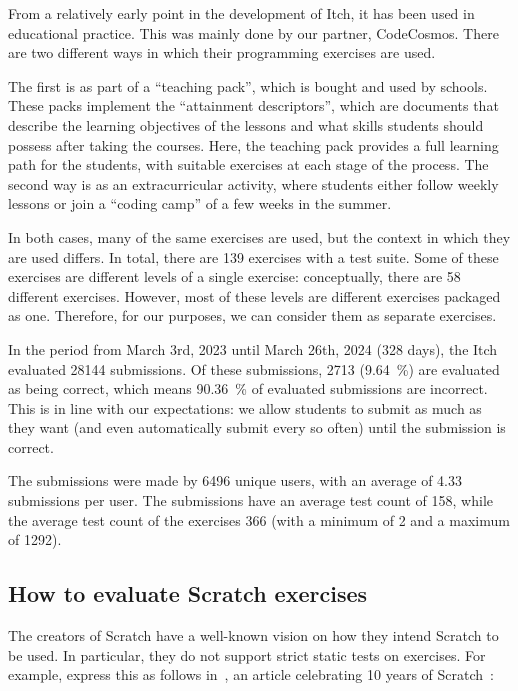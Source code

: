 \documentclass[../main]{subfiles}
\begin{document}
From a relatively early point in the development of Itch, it has been used in educational practice.
This was mainly done by our partner, CodeCosmos.
There are two different ways in which their programming exercises are used.

The first is as part of a ``teaching pack'', which is bought and used by schools.
These packs implement the ``attainment descriptors'', which are documents that describe the learning objectives of the lessons and what skills students should possess after taking the courses.
Here, the teaching pack provides a full learning path for the students, with suitable exercises at each stage of the process.
The second way is as an extracurricular activity, where students either follow weekly lessons or join a ``coding camp'' of a few weeks in the summer.

In both cases, many of the same exercises are used, but the context in which they are used differs.
In total, there are 139 exercises with a test suite.
Some of these exercises are different levels of a single exercise: conceptually, there are 58 different exercises.
However, most of these levels are different exercises packaged as one.
Therefore, for our purposes, we can consider them as separate exercises.

In the period from March 3rd, 2023 until March 26th, 2024 (328 days), the Itch evaluated \num{28144} submissions.
Of these submissions, \num{2713} (\qty{9.64}{\percent}) are evaluated as being correct, which means \qty{90.36}{\percent} of evaluated submissions are incorrect.
This is in line with our expectations: we allow students to submit as much as they want (and even automatically submit every so often) until the submission is correct.

The submissions were made by \num{6496} unique users, with an average of \num{4.33} submissions per user.
The submissions have an average test count of \num{158}, while the average test count of the exercises \num{366} (with a minimum of \num{2} and a maximum of \num{1292}).

\subsection{How to evaluate Scratch exercises}\label{subsec:how-to-evaluate-scratch-exercises}

The creators of Scratch have a well-known vision on how they intend Scratch to be used.
In particular, they do not support strict static tests on exercises.
For example, \citeauthor{resnickCodingCrossroads2020} express this as follows in~, an article celebrating 10 years of Scratch~\autocite{resnickCodingCrossroads2020}:
\end{document}
